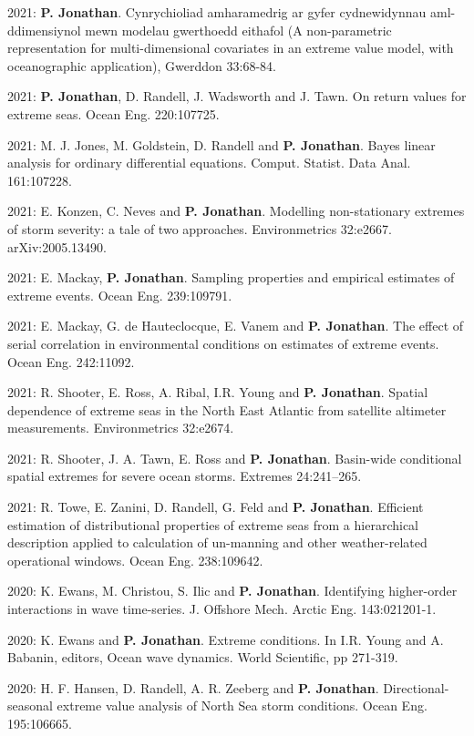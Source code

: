 \documentclass[11pt,a4paper]{moderncv}
\begin{document}
2021: \textbf{P. Jonathan}. Cynrychioliad amharamedrig ar gyfer cydnewidynnau aml-ddimensiynol mewn modelau gwerthoedd eithafol (A non-parametric representation for multi-dimensional covariates in an extreme value model, with oceanographic application), Gwerddon 33:68-84. 

2021: \textbf{P. Jonathan}, D. Randell, J. Wadsworth and J. Tawn. On return values for extreme seas. Ocean Eng. 220:107725.

2021: M. J. Jones, M. Goldstein, D. Randell and \textbf{P. Jonathan}. Bayes linear analysis for ordinary differential equations. Comput. Statist. Data Anal. 161:107228.

2021: E. Konzen, C. Neves and \textbf{P. Jonathan}. Modelling non-stationary extremes of storm severity: a tale of two approaches. Environmetrics 32:e2667. arXiv:2005.13490.

2021: E. Mackay,  \textbf{P. Jonathan}. Sampling properties and empirical estimates of extreme events. Ocean Eng. 239:109791.

2021: E. Mackay, G. de Hauteclocque, E. Vanem and \textbf{P. Jonathan}. The effect of serial correlation in environmental conditions on estimates of extreme events. Ocean Eng. 242:11092.

2021: R. Shooter, E. Ross, A. Ribal, I.R. Young and \textbf{P. Jonathan}. Spatial dependence of extreme seas in the North East Atlantic from satellite altimeter measurements. Environmetrics 32:e2674.

2021: R. Shooter, J. A. Tawn, E. Ross  and \textbf{P. Jonathan}. Basin-wide conditional spatial extremes for severe ocean storms. Extremes 24:241--265.

2021: R. Towe, E. Zanini, D. Randell, G. Feld and \textbf{P. Jonathan}. Efficient estimation of distributional properties of extreme seas from a hierarchical description applied to calculation of un-manning and other weather-related operational windows. Ocean Eng. 238:109642.

2020: K. Ewans, M. Christou, S. Ilic and \textbf{P. Jonathan}. Identifying higher-order interactions in wave time-series. J. Offshore Mech. Arctic Eng. 143:021201-1.

2020: K. Ewans and \textbf{P. Jonathan}. Extreme conditions. In I.R. Young and A. Babanin, editors, Ocean wave dynamics. World Scientific, pp 271-319.

2020: H. F. Hansen, D. Randell, A. R. Zeeberg and \textbf{P. Jonathan}. Directional-seasonal extreme value analysis of North Sea storm conditions. Ocean Eng. 195:106665. 
\end{document}
